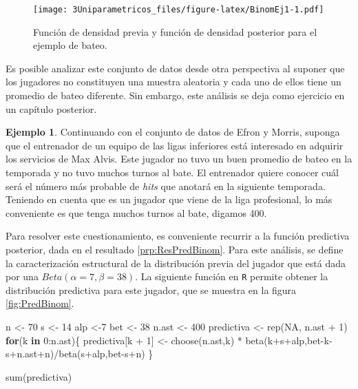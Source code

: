 \documentclass[
  12pt,
  spanish,
]{book}
\newenvironment{Shaded}{\begin{snugshade}}{\end{snugshade}}
\newcommand{\ConstantTok}[1]{\textcolor[rgb]{0.00,0.00,0.00}{#1}}
\newcommand{\ControlFlowTok}[1]{\textcolor[rgb]{0.13,0.29,0.53}{\textbf{#1}}}
\newcommand{\DecValTok}[1]{\textcolor[rgb]{0.00,0.00,0.81}{#1}}
\newcommand{\FunctionTok}[1]{\textcolor[rgb]{0.00,0.00,0.00}{#1}}
\newcommand{\NormalTok}[1]{#1}
\newcommand{\OtherTok}[1]{\textcolor[rgb]{0.56,0.35,0.01}{#1}}
\newcommand{\SpecialCharTok}[1]{\textcolor[rgb]{0.00,0.00,0.00}{#1}}
\theoremstyle{definition}
\theoremstyle{definition}
\newtheorem{example}{Ejemplo}[chapter]
\theoremstyle{definition}
\theoremstyle{definition}
\theoremstyle{remark}
\begin{document}
\begin{figure}
\centering
\texttt{[image: 3Uniparametricos\_files/figure-latex/BinomEj1-1.pdf]}
\caption{\label{fig:BinomEj1}Función de densidad previa y función de densidad posterior para el ejemplo de bateo.}
\end{figure}

Es posible analizar este conjunto de datos desde otra perspectiva al suponer que los jugadores no constituyen una muestra aleatoria y cada uno de ellos tiene un promedio de bateo diferente. Sin embargo, este análisis se deja como ejercicio en un capítulo posterior.

\begin{example}
\protect\hypertarget{exm:unnamed-chunk-29}{}{\label{exm:unnamed-chunk-29} }Continuando con el conjunto de datos de Efron y Morris, suponga que el entrenador de un equipo de las ligas inferiores está interesado en adquirir los servicios de Max Alvis. Este jugador no tuvo un buen promedio de bateo en la temporada y no tuvo muchos turnos al bate. El entrenador quiere conocer cuál será el número más probable de \emph{hits} que anotará en la siguiente temporada. Teniendo en cuenta que es un jugador que viene de la liga profesional, lo más conveniente es que tenga muchos turnos al bate, digamos 400.

Para resolver este cuestionamiento, es conveniente recurrir a la función predictiva posterior, dada en el resultado \ref{prp:ResPredBinom}. Para este análisis, se define la caracterización estructural de la distribución previa del jugador que está dada por una \(Beta(\alpha=7, \beta=38)\). La siguiente función en \texttt{R} permite obtener la distribución predictiva para este jugador, que se muestra en la figura \ref{fig:PredBinom}.
\end{example}

\begin{Shaded}
\begin{Highlighting}[]
\NormalTok{n }\OtherTok{\textless{}{-}} \DecValTok{70}
\NormalTok{s }\OtherTok{\textless{}{-}} \DecValTok{14}
\NormalTok{alp }\OtherTok{\textless{}{-}}\DecValTok{7}
\NormalTok{bet }\OtherTok{\textless{}{-}} \DecValTok{38}
\NormalTok{n.ast }\OtherTok{\textless{}{-}} \DecValTok{400}
\NormalTok{predictiva }\OtherTok{\textless{}{-}} \FunctionTok{rep}\NormalTok{(}\ConstantTok{NA}\NormalTok{, n.ast }\SpecialCharTok{+} \DecValTok{1}\NormalTok{)}
\ControlFlowTok{for}\NormalTok{(k }\ControlFlowTok{in} \DecValTok{0}\SpecialCharTok{:}\NormalTok{n.ast)\{}
\NormalTok{  predictiva[k }\SpecialCharTok{+} \DecValTok{1}\NormalTok{] }\OtherTok{\textless{}{-}}
  \FunctionTok{choose}\NormalTok{(n.ast,k) }\SpecialCharTok{*}
    \FunctionTok{beta}\NormalTok{(k}\SpecialCharTok{+}\NormalTok{s}\SpecialCharTok{+}\NormalTok{alp,bet}\SpecialCharTok{{-}}\NormalTok{k}\SpecialCharTok{{-}}\NormalTok{s}\SpecialCharTok{+}\NormalTok{n.ast}\SpecialCharTok{+}\NormalTok{n)}\SpecialCharTok{/}\FunctionTok{beta}\NormalTok{(s}\SpecialCharTok{+}\NormalTok{alp,bet}\SpecialCharTok{{-}}\NormalTok{s}\SpecialCharTok{+}\NormalTok{n)}
\NormalTok{\}}

\FunctionTok{sum}\NormalTok{(predictiva)}
\end{Highlighting}
\end{Shaded}
\end{document}
